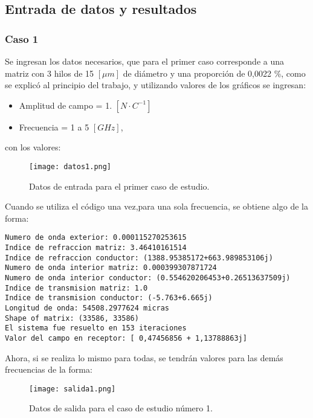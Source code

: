 \documentclass[12pt,letterpaper]{article}
\numberwithin{equation}{section}
\begin{document}
\subsection{Entrada de datos y resultados}

\subsubsection{Caso 1}

Se ingresan los datos necesarios, que para el primer caso corresponde a una matriz con 3 hilos de 15 $[\mu m]$ de diámetro y una proporción de 0,0022 \%, como se explicó al principio del trabajo, y utilizando valores de los gráficos se ingresan:

\begin{itemize}
	\item Amplitud de campo = 1. $[N \cdotp C^{-1}]$
	\item Frecuencia = 1 a 5 $[GHz]$,
\end{itemize}
\noindent con los valores:

\begin{figure}[H]
	\centering\texttt{[image: datos1.png]}\\
	\caption{Datos de entrada para el primer caso de estudio.}
	\label{fig:datos1}
\end{figure} 


Cuando se utiliza el código una vez,para una sola frecuencia, se obtiene algo de la forma:

\begin{lstlisting}
Numero de onda exterior: 0.000115270253615
Indice de refraccion matriz: 3.46410161514
Indice de refraccion conductor: (1388.95385172+663.989853106j)
Numero de onda interior matriz: 0.000399307871724
Numero de onda interior conductor: (0.554620206453+0.26513637509j)
Indice de transmision matriz: 1.0
Indice de transmision conductor: (-5.763+6.665j)
Longitud de onda: 54508.2977624 micras
Shape of matrix: (33586, 33586)
El sistema fue resuelto en 153 iteraciones
Valor del campo en receptor: [ 0,47456856 + 1,13788863j]
\end{lstlisting}

Ahora, si se realiza lo mismo para todas, se tendrán valores para las demás frecuencias de la forma:

\begin{figure}[H]
	\centering\texttt{[image: salida1.png]}\\
	\caption{Datos de salida para el caso de estudio número 1.}
	\label{fig:salida1}
\end{figure} 
\end{document}
